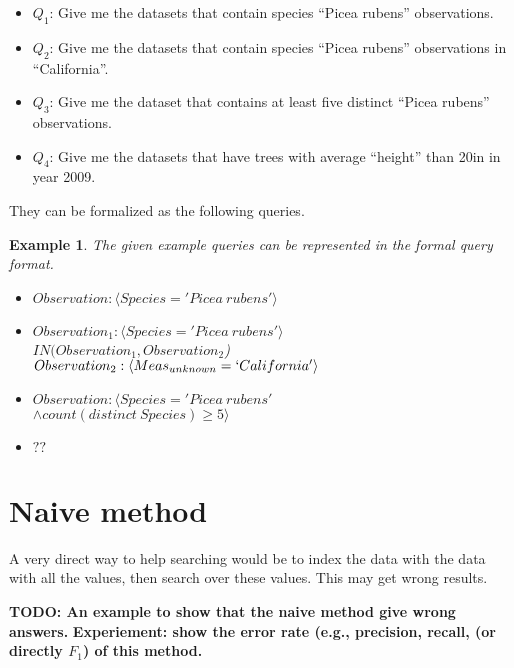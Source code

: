 \documentclass[conference]{IEEEtran}
\newtheorem{example}{Example}[section]
\begin{document}
\begin{itemize}
\item $Q_1$: Give me the datasets that contain species ``Picea rubens'' observations.
\item $Q_2$: Give me the datasets that contain species ``Picea rubens''
  observations in ``California''. 
\item $Q_3$: Give me the dataset that contains at least five distinct ``Picea rubens'' observations.
\item $Q_4$: Give me the datasets that have trees with average ``height''
  than 20in in year 2009. 
\end{itemize}

They can be formalized as the following queries. 

\begin{example}
The given example queries can be represented in the formal query
format. 
\begin{itemize}
\item $Observation: \langle Species='Picea~rubens'\rangle$
\item $Observation_1: \langle Species='Picea~rubens'\rangle$\\
  $IN(Observation_1, Observation_2$) \\
$Observation_2: \langle Meas_{unknown}=`California'\rangle$
\item $Observation: \langle Species='Picea~rubens' $\\
$\wedge
  count(distinct~Species)\geq 5\rangle$
\item $??$
\end{itemize}

\end{example}

\section{Naive method}\label{sec:naive}
A very direct way to help searching would be to index the data with
the data with all the values, then search over these values. 
This may get wrong results. 

{\bf TODO: An example to show that the naive method give wrong answers.}
{\bf Experiement: show the error rate (e.g., precision, recall, (or
  directly $F_1$) of this method.}
\end{document}
